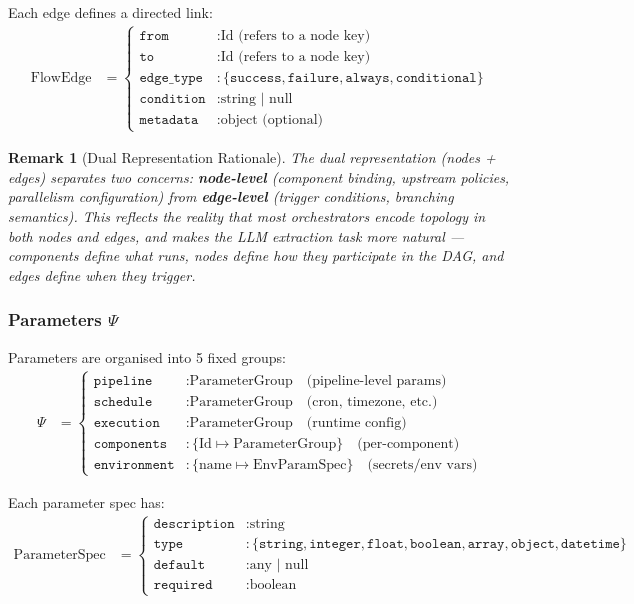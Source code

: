 \documentclass[11pt,a4paper]{article}
\newtheorem{remark}{Remark}[section]
\theoremstyle{definition}
\begin{document}
Each edge defines a directed link:
\begin{align}
\text{FlowEdge} &=
\begin{cases}
\texttt{from}      &: \text{Id (refers to a node key)} \\
\texttt{to}        &: \text{Id (refers to a node key)} \\
\texttt{edge\_type}&: \{\texttt{success}, \texttt{failure}, \texttt{always}, \texttt{conditional}\} \\
\texttt{condition} &: \text{string | null} \\
\texttt{metadata}  &: \text{object (optional)}
\end{cases}
\end{align}

\begin{remark}[Dual Representation Rationale]
The dual representation (nodes + edges) separates two concerns: \textbf{node-level} (component binding, upstream policies, parallelism configuration) from \textbf{edge-level} (trigger conditions, branching semantics). This reflects the reality that most orchestrators encode topology in both nodes and edges, and makes the LLM extraction task more natural — components define \emph{what} runs, nodes define \emph{how} they participate in the DAG, and edges define \emph{when} they trigger.
\end{remark}

\subsubsection{Parameters $\Psi$}
Parameters are organised into 5 fixed groups:
\begin{align}
\Psi &=
\begin{cases}
\texttt{pipeline}    &: \text{ParameterGroup} \quad \text{(pipeline-level params)} \\
\texttt{schedule}    &: \text{ParameterGroup} \quad \text{(cron, timezone, etc.)} \\
\texttt{execution}   &: \text{ParameterGroup} \quad \text{(runtime config)} \\
\texttt{components}  &: \{\text{Id} \mapsto \text{ParameterGroup}\} \quad \text{(per-component)} \\
\texttt{environment} &: \{\text{name} \mapsto \text{EnvParamSpec}\} \quad \text{(secrets/env vars)}
\end{cases}
\end{align}

Each parameter spec has:
\begin{align}
\text{ParameterSpec} &=
\begin{cases}
\texttt{description} &: \text{string} \\
\texttt{type}        &: \{\texttt{string}, \texttt{integer}, \texttt{float}, \texttt{boolean}, \texttt{array}, \texttt{object}, \texttt{datetime}\} \\
\texttt{default}     &: \text{any | null} \\
\texttt{required}    &: \text{boolean}
\end{cases}
\end{align}
\end{document}
